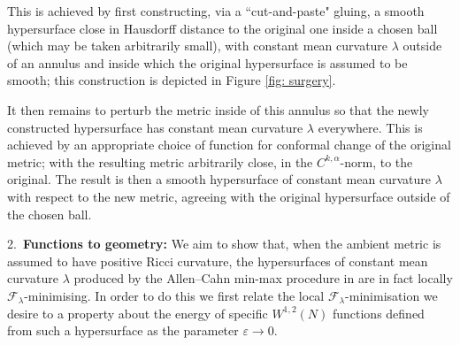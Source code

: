\documentclass[11pt]{article}
\begin{document}
\bigskip

This is achieved by first constructing, via a “cut-and-paste" gluing, a smooth hypersurface close in Hausdorff distance to the original one inside a chosen ball (which may be taken arbitrarily small), with constant mean curvature $\lambda$ outside of an annulus and inside which the original hypersurface is assumed to be smooth; this construction is depicted in Figure \ref{fig: surgery}.

\bigskip

It then remains to perturb the metric inside of this annulus so that the newly constructed hypersurface has constant mean curvature $\lambda$ everywhere. This is achieved by an appropriate choice of function for conformal change of the original metric; with the resulting metric arbitrarily close, in the $C^{k,\alpha}$-norm, to the original. The result is then a smooth hypersurface of constant mean curvature $\lambda$ with respect to the new metric, agreeing with the original hypersurface outside of the chosen ball.

\bigskip

2.~\textbf{Functions to geometry:} 
We aim to show that, when the ambient metric is assumed to have positive Ricci curvature, the hypersurfaces of constant mean curvature $\lambda$ produced by the Allen--Cahn min-max procedure in \cite{bellettini-wickramasekera} are in fact locally $\mathcal{F}_\lambda$-minimising. In order to do this we first relate the local $\mathcal{F}_\lambda$-minimisation we desire to a property about the energy of specific $W^{1,2}(N)$ functions defined from such a hypersurface as the parameter $\varepsilon \rightarrow 0$.
\end{document}
